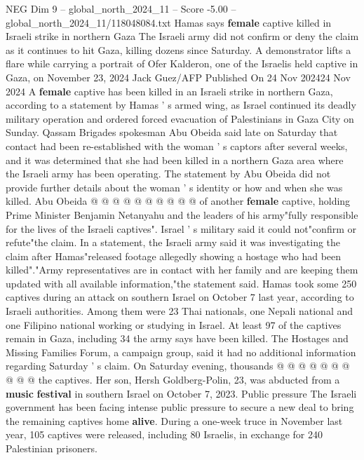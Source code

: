 \begin{textsample}{NEG Dim 9 – global\_north\_2024\_11 – Score -5.00 – global\_north\_2024\_11/118048084.txt}  \label{ex:f9_neg_208}
Hamas says \textbf{female} captive killed in Israeli strike in northern Gaza The Israeli army did not confirm or deny the claim as it continues to hit Gaza, killing dozens since Saturday.
A demonstrator lifts a flare while carrying a portrait of Ofer Kalderon, one of the Israelis held captive in Gaza, on November 23, 2024 Jack Guez/AFP Published On 24 Nov 202424 Nov 2024 A \textbf{female} captive has been killed in an Israeli strike in northern Gaza, according to a statement by Hamas ' s armed wing, as Israel continued its deadly military operation and ordered forced evacuation of Palestinians in Gaza City on Sunday.
Qassam Brigades spokesman Abu Obeida said late on Saturday that contact had been re-established with the woman ' s captors after several weeks, and it was determined that she had been killed in a northern Gaza area where the Israeli army has been operating.
The statement by Abu Obeida did not provide further details about the woman ' s identity or how and when she was killed.
Abu Obeida @ @ @ @ @ @ @ @ @ @ of another \textbf{female} captive, holding Prime Minister Benjamin Netanyahu and the leaders of his army"fully responsible for the lives of the Israeli captives".
Israel ' s military said it could not"confirm or refute"the claim.
In a statement, the Israeli army said it was investigating the claim after Hamas"released footage allegedly showing a hostage who had been killed"."Army representatives are in contact with her family and are keeping them updated with all available information,"the statement said.
Hamas took some 250 captives during an attack on southern Israel on October 7 last year, according to Israeli authorities.
Among them were 23 Thai nationals, one Nepali national and one Filipino national working or studying in Israel.
At least 97 of the captives remain in Gaza, including 34 the army says have been killed.
The Hostages and Missing Families Forum, a campaign group, said it had no additional information regarding Saturday ' s claim.
On Saturday evening, thousands @ @ @ @ @ @ @ @ @ @ the captives.
Her son, Hersh Goldberg-Polin, 23, was abducted from a \textbf{music} \textbf{festival} in southern Israel on October 7, 2023.
Public pressure The Israeli government has been facing intense public pressure to secure a new deal to bring the remaining captives home \textbf{alive}.
During a one-week truce in November last year, 105 captives were released, including 80 Israelis, in exchange for 240 Palestinian prisoners.

\end{textsample}
